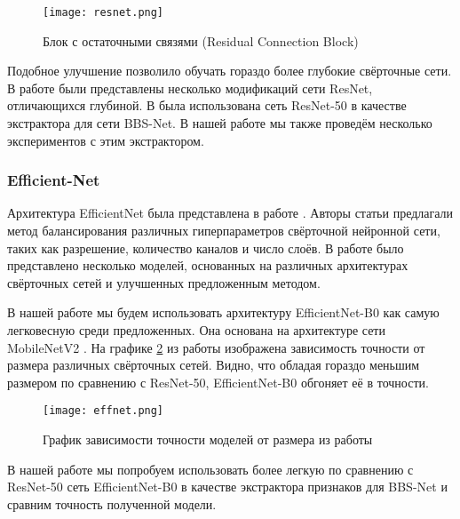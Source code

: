 \begin{figure}[h!]
    \centering
    \texttt{[image: resnet.png]}
    \caption{Блок с остаточными связями (Residual Connection Block)}
    \label{fig:resnet}
\end{figure}

Подобное улучшение позволило обучать гораздо более глубокие свёрточные сети. 
В работе были представлены несколько модификаций сети ResNet, отличающихся глубиной.
В \cite{BBS} была использована сеть ResNet-50 в качестве экстрактора для сети BBS-Net. В нашей работе 
мы также проведём несколько экспериментов с этим экстрактором.

\subsubsection{Efficient-Net}

Архитектура EfficientNet была представлена в работе \cite{Efficientnet}. Авторы статьи предлагали метод 
балансирования различных гиперпараметров свёрточной нейронной сети, таких как разрешение, количество каналов  и число слоёв.
В работе \cite{Efficientnet} было представлено несколько моделей, основанных на различных архитектурах свёрточных сетей
и улучшенных предложенным методом.

В нашей работе мы будем использовать архитектуру EfficientNet-B0 как самую легковесную среди предложенных.
Она основана на архитектуре сети MobileNetV2 \cite{MobileNetV2}. На графике \ref{fig:effent} из работы \cite{Efficientnet}
изображена зависимость точности от размера различных свёрточных сетей. Видно, что обладая гораздо меньшим размером 
по сравнению с ResNet-50, EfficientNet-B0 обгоняет её в точности.

 \begin{figure}[h!]
    \centering
    \texttt{[image: effnet.png]}
    \caption{График зависимости точности моделей от размера из работы \cite{Efficientnet}}
    \label{fig:effent}
\end{figure}

В нашей работе мы попробуем использовать более легкую по сравнению с ResNet-50 сеть EfficientNet-B0 в качестве экстрактора признаков для BBS-Net
и сравним точность полученной модели.
